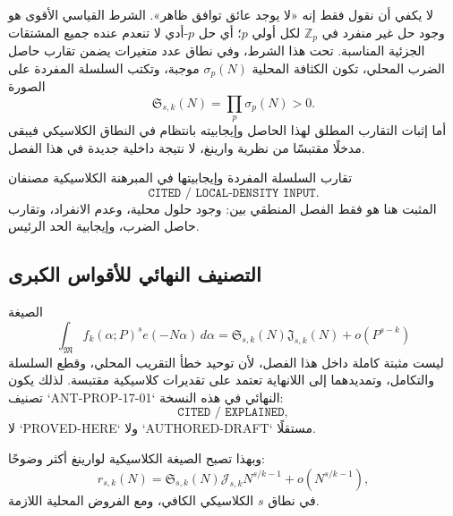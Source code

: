 لا يكفي أن نقول فقط إنه «لا يوجد عائق توافق ظاهر». الشرط القياسي الأقوى هو وجود حل غير منفرد في $\mathbb Z_p$ لكل أولي $p$؛ أي حل $p$-أدي لا تنعدم عنده جميع المشتقات الجزئية المناسبة. تحت هذا الشرط، وفي نطاق عدد متغيرات يضمن تقارب حاصل الضرب المحلي، تكون الكثافة المحلية $\sigma_p(N)$ موجبة، وتكتب السلسلة المفردة على الصورة
\[
\mathfrak S_{s,k}(N)=\prod_p \sigma_p(N)>0.
\]
أما إثبات التقارب المطلق لهذا الحاصل وإيجابيته بانتظام في النطاق الكلاسيكي فيبقى مدخلًا مقتبسًا من نظرية وارينغ، لا نتيجة داخلية جديدة في هذا الفصل.

\begin{remark}
تقارب السلسلة المفردة وإيجابيتها في المبرهنة الكلاسيكية مصنفان
\[
\texttt{CITED / LOCAL-DENSITY INPUT}.
\]
المثبت هنا هو فقط الفصل المنطقي بين: وجود حلول محلية، وعدم الانفراد، وتقارب حاصل الضرب، وإيجابية الحد الرئيس.
\end{remark}

\subsection{التصنيف النهائي للأقواس الكبرى}

الصيغة
\[
\int_{\mathfrak M}f_k(\alpha;P)^s e(-N\alpha)\,d\alpha
=
\mathfrak S_{s,k}(N)\mathfrak J_{s,k}(N)
+o(P^{s-k})
\]
ليست مثبتة كاملة داخل هذا الفصل، لأن توحيد خطأ التقريب المحلي، وقطع السلسلة والتكامل، وتمديدهما إلى اللانهاية تعتمد على تقديرات كلاسيكية مقتبسة. لذلك يكون تصنيف `ANT-PROP-17-01` النهائي في هذه النسخة:
\[
\texttt{CITED / EXPLAINED},
\]
لا `PROVED-HERE` ولا `AUTHORED-DRAFT` مستقلًا.

وبهذا تصبح الصيغة الكلاسيكية لوارينغ أكثر وضوحًا:
\[
r_{s,k}(N)
=
\mathfrak S_{s,k}(N)\mathcal J_{s,k}N^{s/k-1}
+o\!\left(N^{s/k-1}\right),
\]
في نطاق $s$ الكلاسيكي الكافي، ومع الفروض المحلية اللازمة.
